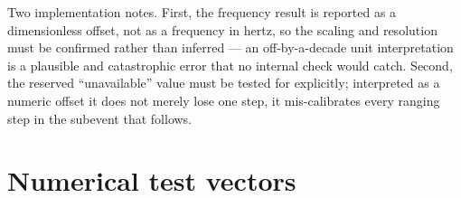 \documentclass[11pt,a4paper]{article}
\begin{document}
Two implementation notes. First, the frequency result is reported as a dimensionless offset, not as a
frequency in hertz, so the scaling and resolution must be confirmed rather than inferred --- an
off-by-a-decade unit interpretation is a plausible and catastrophic error that no internal check
would catch. Second, the reserved ``unavailable'' value must be tested for explicitly; interpreted as
a numeric offset it does not merely lose one step, it mis-calibrates every ranging step in the
subevent that follows.

\section{Numerical test vectors}
\end{document}
